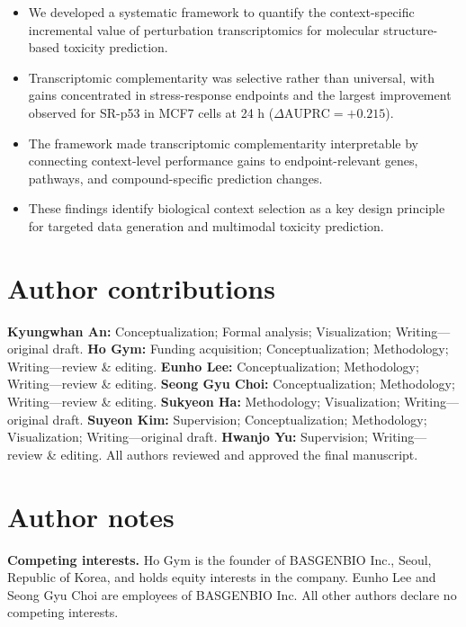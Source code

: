 \documentclass[11pt,a4paper]{article}
\begin{document}
\begin{itemize}[itemsep=\baselineskip]

\item We developed a systematic framework to quantify the context-specific incremental value of perturbation transcriptomics for molecular structure-based toxicity prediction.

\item Transcriptomic complementarity was selective rather than universal, with gains concentrated in stress-response endpoints and the largest improvement observed for SR-p53 in MCF7 cells at 24 h (\(\Delta\mathrm{AUPRC}=+0.215\)).

\item The framework made transcriptomic complementarity interpretable by connecting context-level performance gains to endpoint-relevant genes, pathways, and compound-specific prediction changes.

\item These findings identify biological context selection as a key design principle for targeted data generation and multimodal toxicity prediction.

\end{itemize}

\section*{Author contributions}

\textbf{Kyungwhan An:} Conceptualization; Formal analysis; Visualization;
Writing---original draft.
\textbf{Ho Gym:} Funding acquisition; Conceptualization; Methodology; Writing---review \& editing.
\textbf{Eunho Lee:} Conceptualization; Methodology; Writing---review \& editing.
\textbf{Seong Gyu Choi:} Conceptualization; Methodology; Writing---review \& editing.
\textbf{Sukyeon Ha:} Methodology; Visualization;
Writing---original draft.
\textbf{Suyeon Kim:} Supervision; Conceptualization; Methodology; Visualization;
Writing---original draft.
\textbf{Hwanjo Yu:} Supervision; Writing---review \& editing.
All authors reviewed and approved the final manuscript.

\section*{Author notes}

\textbf{Competing interests.}
Ho Gym is the founder of BASGENBIO Inc., Seoul, Republic of Korea, and holds
equity interests in the company. Eunho Lee and Seong Gyu Choi are employees of BASGENBIO Inc. All other authors declare no competing interests.
\end{document}
